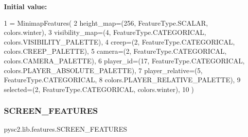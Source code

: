 {\bfseries Initial value\+:}
\begin{DoxyCode}
1 =  MinimapFeatures(
2     height\_map=(256, FeatureType.SCALAR, colors.winter),
3     visibility\_map=(4, FeatureType.CATEGORICAL, colors.VISIBILITY\_PALETTE),
4     creep=(2, FeatureType.CATEGORICAL, colors.CREEP\_PALETTE),
5     camera=(2, FeatureType.CATEGORICAL, colors.CAMERA\_PALETTE),
6     player\_id=(17, FeatureType.CATEGORICAL, colors.PLAYER\_ABSOLUTE\_PALETTE),
7     player\_relative=(5, FeatureType.CATEGORICAL,
8                      colors.PLAYER\_RELATIVE\_PALETTE),
9     selected=(2, FeatureType.CATEGORICAL, colors.winter),
10 )
\end{DoxyCode}
\mbox{\label{namespacepysc2_1_1lib_1_1features_a13e90de46283a5e5191bab0451492127}} 
\subsubsection{\texorpdfstring{S\+C\+R\+E\+E\+N\+\_\+\+F\+E\+A\+T\+U\+R\+ES}{SCREEN\_FEATURES}}
{\footnotesize\ttfamily pysc2.\+lib.\+features.\+S\+C\+R\+E\+E\+N\+\_\+\+F\+E\+A\+T\+U\+R\+ES}

